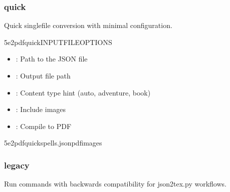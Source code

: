 \documentclass[letterpaper,10pt,english]{sphinxmanual}
\begin{document}
\subsubsection{quick}
\label{\detokenize{user-guide/cli-reference:quick}}
\sphinxAtStartPar
Quick single\sphinxhyphen{}file conversion with minimal configuration.

\begin{sphinxVerbatim}[commandchars=\\\{\}]
5e2pdfquickINPUT\PYGZus{}FILE\PYG{o}{[}OPTIONS\PYG{o}{]}
\end{sphinxVerbatim}

\sphinxAtStartPar
{}
\begin{itemize}
\item {} 
\sphinxAtStartPar
{}: Path to the JSON file

\end{itemize}

\sphinxAtStartPar
{}
\begin{itemize}
\item {} 
\sphinxAtStartPar
{}: Output file path

\item {} 
\sphinxAtStartPar
{}: Content type hint (auto, adventure, book)

\item {} 
\sphinxAtStartPar
{}: Include images

\item {} 
\sphinxAtStartPar
{}: Compile to PDF

\end{itemize}

\sphinxAtStartPar
{}

\begin{sphinxVerbatim}[commandchars=\\\{\}]
5e2pdfquickspells.json\PYGZhy{}\PYGZhy{}pdf\PYGZhy{}\PYGZhy{}images
\end{sphinxVerbatim}


\subsubsection{legacy}
\label{\detokenize{user-guide/cli-reference:legacy}}
\sphinxAtStartPar
Run commands with backwards compatibility for json2tex.py workflows.
\end{document}
